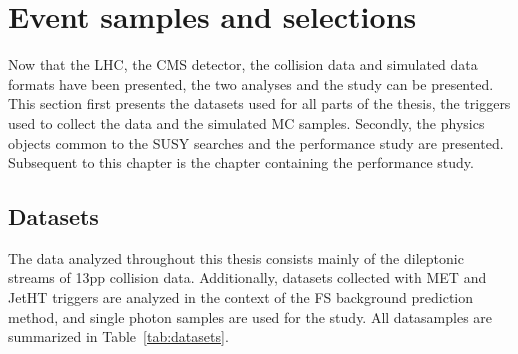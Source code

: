 \chapter{Event samples and selections}

Now that the LHC, the CMS detector, the collision data and simulated data formats have been presented, the two analyses and the \ptmiss study can be presented. 
This section first presents the datasets used for all parts of the thesis, the triggers used to collect the data and the simulated MC samples. 
Secondly, the physics objects common to the SUSY searches and the \ptmiss performance study are presented. Subsequent to this chapter is the chapter containing the \ptmiss performance study. 
  
\section{Datasets}
\label{sec:samplesObjects}

The data analyzed throughout this thesis consists mainly of the dileptonic streams of 13\TeV pp collision data.  
Additionally, datasets collected with MET and JetHT triggers are analyzed in the context of the FS background prediction method, and single photon samples are used for the \ptmiss study. 
All datasamples are summarized in Table~\ref{tab:datasets}.  

